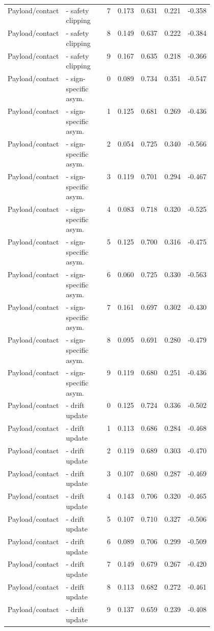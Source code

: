 \documentclass{article}
\begin{document}
\begin{center}
\begin{longtable}{p{0.13\linewidth}p{0.34\linewidth}rrrrr}
Payload/contact & - safety clipping & 7 & 0.173 & 0.631 & 0.221 & -0.358\\
Payload/contact & - safety clipping & 8 & 0.149 & 0.637 & 0.222 & -0.384\\
Payload/contact & - safety clipping & 9 & 0.167 & 0.635 & 0.218 & -0.366\\
Payload/contact & - sign-specific asym. & 0 & 0.089 & 0.734 & 0.351 & -0.547\\
Payload/contact & - sign-specific asym. & 1 & 0.125 & 0.681 & 0.269 & -0.436\\
Payload/contact & - sign-specific asym. & 2 & 0.054 & 0.725 & 0.340 & -0.566\\
Payload/contact & - sign-specific asym. & 3 & 0.119 & 0.701 & 0.294 & -0.467\\
Payload/contact & - sign-specific asym. & 4 & 0.083 & 0.718 & 0.320 & -0.525\\
Payload/contact & - sign-specific asym. & 5 & 0.125 & 0.700 & 0.316 & -0.475\\
Payload/contact & - sign-specific asym. & 6 & 0.060 & 0.725 & 0.330 & -0.563\\
Payload/contact & - sign-specific asym. & 7 & 0.161 & 0.697 & 0.302 & -0.430\\
Payload/contact & - sign-specific asym. & 8 & 0.095 & 0.691 & 0.280 & -0.479\\
Payload/contact & - sign-specific asym. & 9 & 0.119 & 0.680 & 0.251 & -0.436\\
Payload/contact & - drift update & 0 & 0.125 & 0.724 & 0.336 & -0.502\\
Payload/contact & - drift update & 1 & 0.113 & 0.686 & 0.284 & -0.468\\
Payload/contact & - drift update & 2 & 0.119 & 0.689 & 0.303 & -0.470\\
Payload/contact & - drift update & 3 & 0.107 & 0.680 & 0.287 & -0.469\\
Payload/contact & - drift update & 4 & 0.143 & 0.706 & 0.320 & -0.465\\
Payload/contact & - drift update & 5 & 0.107 & 0.710 & 0.327 & -0.506\\
Payload/contact & - drift update & 6 & 0.089 & 0.706 & 0.299 & -0.509\\
Payload/contact & - drift update & 7 & 0.149 & 0.679 & 0.267 & -0.420\\
Payload/contact & - drift update & 8 & 0.113 & 0.682 & 0.272 & -0.461\\
Payload/contact & - drift update & 9 & 0.137 & 0.659 & 0.239 & -0.408\\

\end{longtable}
\end{center}
\end{document}
